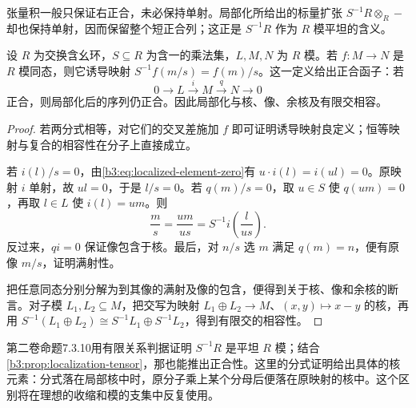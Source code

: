 张量积一般只保证右正合，未必保持单射。局部化所给出的标量扩张 \(S^{-1}R\otimes_R-\) 却也保持单射，因而保留整个短正合列；这正是 \(S^{-1}R\) 作为 \(R\) 模平坦的含义。

\begin{theorem}\label{b3:thm:localization-exact}
	设 \(R\) 为交换含幺环，\(S\subseteq R\) 为含一的乘法集，\(L,M,N\) 为 \(R\) 模。若 \(f:M\rightarrow N\) 是 \(R\) 模同态，则它诱导映射 \(S^{-1}f(m/s)=f(m)/s\)。这一定义给出正合函子：若
	\[
		0\longrightarrow L\xrightarrow{i}M\xrightarrow{q}N\longrightarrow0
	\]
	正合，则局部化后的序列仍正合。因此局部化与核、像、余核及有限交相容。
\end{theorem}
\begin{proof}
	若两分式相等，对它们的交叉差施加 \(f\) 即可证明诱导映射良定义；恒等映射与复合的相容性在分子上直接成立。

	若 \(i(l)/s=0\)，由\eqref{b3:eq:localized-element-zero}有 \(u\cdot i(l)=i(ul)=0\)。原映射 \(i\) 单射，故 \(ul=0\)，于是 \(l/s=0\)。若 \(q(m)/s=0\)，取 \(u\in S\) 使 \(q(um)=0\)，再取 \(l\in L\) 使 \(i(l)=um\)。则
	\[
		\frac ms=\frac{um}{us}=S^{-1}i\left(\frac l{us}\right).
	\]
	反过来，\(qi=0\) 保证像包含于核。最后，对 \(n/s\) 选 \(m\) 满足 \(q(m)=n\)，便有原像 \(m/s\)，证明满射性。

	把任意同态分别分解为到其像的满射及像的包含，便得到关于核、像和余核的断言。对子模 \(L_1,L_2\subseteq M\)，把交写为映射 \(L_1\oplus L_2\rightarrow M\)、\((x,y)\mapsto x-y\) 的核，再用 \(S^{-1}(L_1\oplus L_2)\cong S^{-1}L_1\oplus S^{-1}L_2\)，得到有限交的相容性。
\end{proof}

第二卷命题7.3.10用有限关系判据证明 \(S^{-1}R\) 是平坦 \(R\) 模；结合\cref{b3:prop:localization-tensor}，那也能推出正合性。这里的分式证明给出具体的核元素：分式落在局部核中时，原分子乘上某个分母后便落在原映射的核中。这个区别将在理想的收缩和模的支集中反复使用。
